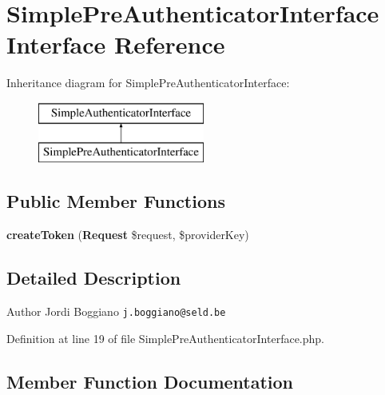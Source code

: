 \section{Simple\+Pre\+Authenticator\+Interface Interface Reference}
\label{interface_symfony_1_1_component_1_1_security_1_1_core_1_1_authentication_1_1_simple_pre_authenticator_interface}
Inheritance diagram for Simple\+Pre\+Authenticator\+Interface\+:\begin{figure}[H]
\begin{center}
\leavevmode
\includegraphics[height=2.000000cm]{interface_symfony_1_1_component_1_1_security_1_1_core_1_1_authentication_1_1_simple_pre_authenticator_interface}
\end{center}
\end{figure}
\subsection*{Public Member Functions}
\begin{DoxyCompactItemize}
\item 
{\bf create\+Token} ({\bf Request} \$request, \$provider\+Key)
\end{DoxyCompactItemize}


\subsection{Detailed Description}
\begin{DoxyAuthor}{Author}
Jordi Boggiano {\tt j.\+boggiano@seld.\+be} 
\end{DoxyAuthor}


Definition at line 19 of file Simple\+Pre\+Authenticator\+Interface.\+php.



\subsection{Member Function Documentation}
